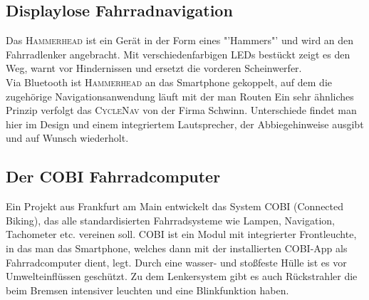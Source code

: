 \subsection{Displaylose Fahrradnavigation}
Das \textsc{Hammerhead} ist ein Gerät in der Form eines "'Hammers"' und wird an den Fahrradlenker angebracht. Mit verschiedenfarbigen \glspl{LED} bestückt zeigt es den Weg, warnt vor Hindernissen und ersetzt die vorderen Scheinwerfer.\\
Via Bluetooth ist \textsc{Hammerhead} an das \gls{Smartphone} gekoppelt, auf dem die zugehörige Navigationsanwendung läuft mit der man Routen
Ein sehr ähnliches Prinzip verfolgt das \textsc{CycleNav} von der Firma Schwinn. Unterschiede findet man hier im Design und einem integriertem Lautsprecher, der Abbiegehinweise ausgibt und auf Wunsch wiederholt. \cite{CycleNav}
\subsection{Der COBI Fahrradcomputer}
Ein Projekt aus Frankfurt am Main entwickelt das System \textsc{COBI} (Connected Biking), das alle standardisierten Fahrradsysteme wie Lampen, Navigation, Tachometer etc. vereinen soll. \textsc{COBI} ist ein Modul mit integrierter Frontleuchte, in das man das \gls{Smartphone}, welches dann mit der installierten \textsc{COBI}-\Gls{App} als Fahrradcomputer dient, legt. Durch eine wasser- und stoßfeste Hülle ist es vor Umwelteinflüssen geschützt. Zu dem Lenkersystem gibt es auch Rückstrahler die beim Bremsen intensiver leuchten und eine Blinkfunktion haben.\\
